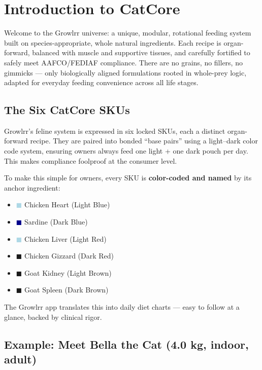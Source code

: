 \section*{Introduction to CatCore}

Welcome to the Growlrr universe: a unique, modular, rotational feeding system built on species-appropriate, whole natural ingredients. Each recipe is organ-forward, balanced with muscle and supportive tissues, and carefully fortified to safely meet AAFCO/FEDIAF compliance. There are no grains, no fillers, no gimmicks --- only biologically aligned formulations rooted in whole-prey logic, adapted for everyday feeding convenience across all life stages.

\subsection*{The Six CatCore SKUs}

Growlrr's feline system is expressed in six locked SKUs, each a distinct organ-forward recipe. They are paired into bonded ``base pairs'' using a light--dark color code system, ensuring owners always feed one light + one dark pouch per day. This makes compliance foolproof at the consumer level.

To make this simple for owners, every SKU is \textbf{color-coded and named} by its anchor ingredient:

\begin{itemize}[leftmargin=1.5em]
\item \textcolor{lightblue}{$\blacksquare$} Chicken Heart (Light Blue)
\item \textcolor{darkblue}{$\blacksquare$}  Sardine (Dark Blue)
\item \textcolor{lightblue}{$\blacksquare$} Chicken Liver (Light Red)
\item \textcolor{darkbrown}{$\blacksquare$} Chicken Gizzard (Dark Red)
\item \textcolor{lightbrown}{$\blacksquare$} Goat Kidney (Light Brown)
\item \textcolor{darkbrown}{$\blacksquare$}  Goat Spleen (Dark Brown)
\end{itemize}

The Growlrr app translates this into daily diet charts --- easy to follow at a glance, backed by clinical rigor.

\subsection*{Example: Meet Bella the Cat (4.0 kg, indoor, adult)}

